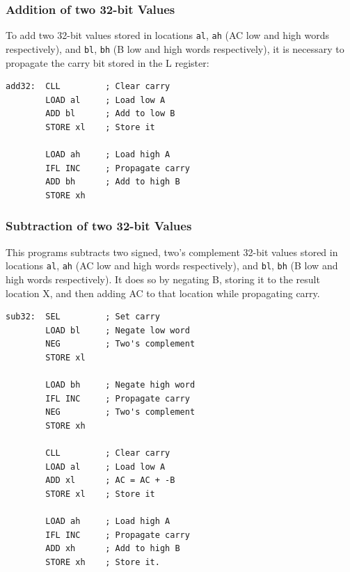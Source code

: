 \documentclass[11pt,a4paper,twocolumns]{article}
\newcommand\register[1]{\textsf{#1}}
\newcommand\A{\register{AC}}
\newcommand\Lreg{\register{L}}
\begin{document}
\subsubsection{Addition of two 32-bit Values}

To add two 32-bit values stored in locations {\tt al}, {\tt ah} (\A{} low
and high words respectively), and {\tt bl}, {\tt bh} (B low and high
words respectively), it is necessary to propagate the carry bit
stored in the \Lreg{} register:

\begin{verbatim}
add32:  CLL         ; Clear carry
        LOAD al     ; Load low A
        ADD bl      ; Add to low B
        STORE xl    ; Store it

        LOAD ah     ; Load high A
        IFL INC     ; Propagate carry
        ADD bh      ; Add to high B
        STORE xh
\end{verbatim}


\subsubsection{Subtraction of two 32-bit Values}

This programs subtracts two signed, two's complement 32-bit values
stored in locations {\tt al}, {\tt ah} (\A{} low and high words
respectively), and {\tt bl}, {\tt bh} (B low and high words
respectively). It does so by negating B, storing it to the result
location X, and then adding \A{} to that location while propagating
carry.

\begin{verbatim}
sub32:  SEL         ; Set carry
        LOAD bl     ; Negate low word
        NEG         ; Two's complement
        STORE xl

        LOAD bh     ; Negate high word
        IFL INC     ; Propagate carry
        NEG         ; Two's complement
        STORE xh

        CLL         ; Clear carry
        LOAD al     ; Load low A
        ADD xl      ; AC = AC + -B
        STORE xl    ; Store it

        LOAD ah     ; Load high A
        IFL INC     ; Propagate carry
        ADD xh      ; Add to high B
        STORE xh    ; Store it.
\end{verbatim}


%
%
%
\end{document}
